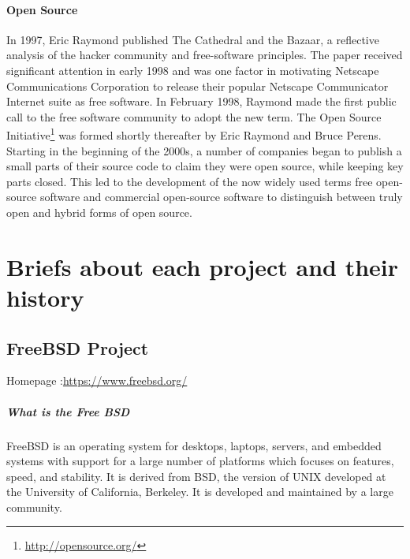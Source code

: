 \documentclass[11pt]{article} %
\begin{document}
\paragraph{Open Source}
In 1997, Eric Raymond published The Cathedral and the Bazaar, a reflective analysis of the hacker community and free-software principles. The paper received significant attention in early 1998 and was one factor in motivating Netscape Communications Corporation to release their popular Netscape Communicator Internet suite as free software. 
In February 1998, Raymond made the first public call to the free software community to adopt the new term. The Open Source Initiative\footnote{\url{http://opensource.org/}} was formed shortly thereafter by Eric Raymond and Bruce Perens.\\
Starting in the beginning of the 2000s, a number of companies began to publish a small parts of their source code to claim they were open source, while keeping key parts closed. This led to the development of the now widely used terms free open-source software and commercial open-source software to distinguish between truly open and hybrid forms of open source.

\section{Briefs about each project and their history}
\subsection{FreeBSD Project }
 Homepage :\url{https://www.freebsd.org/}\\

\subparagraph{What is the Free BSD}

FreeBSD is an operating system for desktops, laptops, servers, and embedded systems with support for a large number of platforms which focuses on features, speed, and stability. It is derived from BSD, the version of UNIX developed at the University of California, Berkeley. It is developed and maintained by a large community.\\
\end{document}
